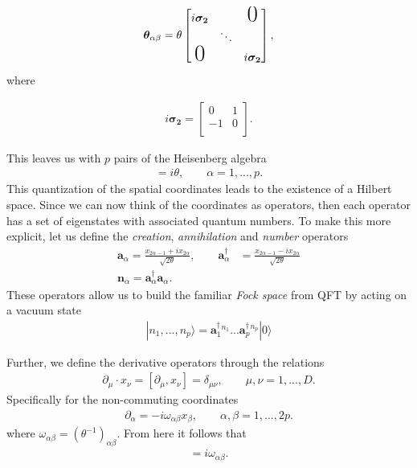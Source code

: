     \begin{align}
        \bm{\theta}_{\alpha \beta } = \theta \begin{bmatrix}
            i \bm{\sigma_2} &  & \text{\huge0} \\
                     & \ddots &  \\
                    \text{\huge0} &  & i \bm{\sigma_2} \\
                \end{bmatrix},
    \end{align}
    where 

    \begin{align}
        i \bm{\sigma_2} = \begin{bmatrix}
            0 & 1 \\
            -1 & 0 \\
        \end{bmatrix}.
    \end{align}

    This leaves us with $p$ pairs of the Heisenberg algebra
    \begin{align}
        [x_{2\alpha -1}, x_{2\alpha}]=i\theta, \qquad \alpha=1,...,p.
    \end{align}
    This quantization of the spatial coordinates leads to the existence of a Hilbert space. Since we can now think of the coordinates as operators, then each operator has a set of eigenstates with associated quantum numbers. To make this more explicit, let us define the \textit{creation}, \textit{annihilation} and \textit{number} operators
    \begin{align}
        \bm{a}_{\alpha} = \frac{x_{2\alpha-1} +i x_{2\alpha}}{\sqrt{2 \theta}}, \qquad \bm{a}^{\dag}_{\alpha} &= \frac{x_{2\alpha-1} -i x_{2\alpha}}{\sqrt{2 \theta}} \\
        \bm{n}_{\alpha} = \bm{a}^{\dag}_{\alpha}\bm{a}_{\alpha}.
    \end{align}
    These operators allow us to build the familiar \textit{Fock space} from QFT by acting on a vacuum state
    \begin{align}
        |n_1,...,n_p\rangle=  \bm{a}^{\dag}_1^{n_1}... \bm{a}^{\dag}_p^{n_p}|0\rangle
    \end{align}

    Further, we define the derivative operators through the relations
    \begin{align}
        \partial_{\mu} \cdot x_{\nu} = [\partial_{\mu}, x_{\nu}] = \delta_{\mu \nu}, \qquad \mu,\nu = 1,...,D.
    \end{align}
    Specifically for the non-commuting coordinates
    \begin{align}
        \partial_{\alpha}= -i \omega_{\alpha \beta} x_{\beta}, \qquad \alpha, \beta = 1,...,2p.
    \end{align}
    where $\omega_{\alpha \beta} = \left(\theta^{-1} \right)_{\alpha \beta}$. From here it follows that
    \begin{align}
        [\partial_{\alpha}, \partial_{\beta}] = i \omega_{\alpha \beta}.
    \end{align}


